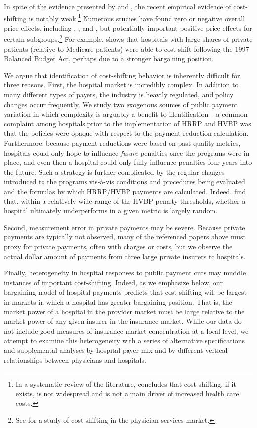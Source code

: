 \documentclass[12pt]{article}
\begin{document}
In spite of the evidence presented by \cite{cutler1998costshift} and \cite{zwanziger2006}, the recent empirical evidence of cost-shifting is notably weak.\footnote{In a systematic review of the literature, \citet{frakt2011} concludes that cost-shifting, if it exists, is not widespread and is not a main driver of increased health care costs.}  Numerous studies have found zero or negative overall price effects, including \cite{dranove2008impact}, \cite{wu2010}, and \cite{dranove2017}, but potentially important positive price effects for certain subgroups.\footnote{See \cite{clemens2017} for a study of cost-shifting in the physician services market.} For example, \cite{wu2010} shows that hospitals with large shares of private patients (relative to Medicare patients) were able to cost-shift following the 1997 Balanced Budget Act, perhaps due to a stronger bargaining position.

We argue that identification of cost-shifting behavior is inherently difficult for three reasons.  First, the hospital market is incredibly complex.  In addition to many different types of payers, the industry is heavily regulated, and policy changes occur frequently.  We study two exogenous sources of public payment variation in which complexity is arguably a benefit to identification -- a common complaint among hospitals prior to the implementation of HRRP and HVBP was that the policies were opaque with respect to the payment reduction calculation.  Furthermore, because payment reductions were based on past quality metrics, hospitals could only hope to influence \textit{future} penalties once the programs were in place, and even then a hospital could only fully influence penalties four years into the future. Such a strategy is further complicated by the regular changes introduced to the programs vis-\`a-vis conditions and procedures being evaluated and the formulas by which HRRP/HVBP payments are calculated. Indeed, \cite{friedson2016} find that, within a relatively wide range of the HVBP penalty thresholds, whether a hospital ultimately underperforms in a given metric is largely random.

Second, measurement error in private payments may be severe. Because private payments are typically not observed, many of the referenced papers above must proxy for private payments, often with charges or costs, but we observe the actual dollar amount of payments from three large private insurers to hospitals.

Finally, heterogeneity in hospital responses to public payment cuts may muddle instances of important cost-shifting. Indeed, as we emphasize below, our bargaining model of hospital payments predicts that cost-shifting will be largest in markets in which a hospital has greater bargaining position. That is, the market power of a hospital in the provider market must be large relative to the market power of any given insurer in the insurance market.  While our data do not include good measures of insurance market concentration at a local level, we attempt to examine this heterogeneity with a series of alternative specifications and supplemental analyses by hospital payer mix and by different vertical relationships between physicians and hospitals.
\end{document}
